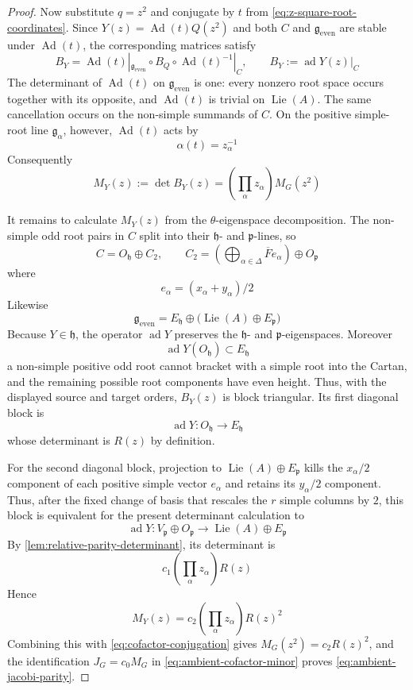 \documentclass[11pt]{amsart}
\theoremstyle{definition}
\theoremstyle{remark}
\newcommand{\Fb}{\overline F}
\newcommand{\Lie}{\operatorname{Lie}}
\newcommand{\Ad}{\operatorname{Ad}}
\newcommand{\ad}{\operatorname{ad}}
\newcommand{\g}{\mathfrak g}
\newcommand{\h}{\mathfrak h}
\newcommand{\p}{\mathfrak p}
\begin{document}
\begin{proof}
Now substitute $q=z^2$ and conjugate by $t$ from
\eqref{eq:z-square-root-coordinates}.  Since
$Y(z)=\Ad(t)Q(z^2)$ and both $C$ and $\g_{\mathrm{even}}$ are stable under
$\Ad(t)$, the corresponding matrices satisfy
\[
 B_Y
 =\Ad(t)|_{\g_{\mathrm{even}}}\circ
   B_Q\circ\Ad(t)^{-1}|_C,
 \qquad
 B_Y:=\ad Y(z)|_C
\]
The determinant of $\Ad(t)$ on $\g_{\mathrm{even}}$ is one: every nonzero
root space occurs together with its opposite, and $\Ad(t)$ is trivial on
$\Lie(A)$.  The same cancellation occurs on the non-simple summands of $C$.
On the positive simple-root line $\g_\alpha$, however,
$\Ad(t)$ acts by
\[
 \alpha(t)=z_\alpha^{-1}
\]
Consequently
\begin{equation}\label{eq:cofactor-conjugation}
 M_Y(z):=\det B_Y(z)
 =\left(\prod_\alpha z_\alpha\right)M_G(z^2)
\end{equation}

It remains to calculate $M_Y(z)$ from the $\theta$-eigenspace decomposition.
The non-simple odd root pairs in $C$ split into their $\h$- and $\p$-lines, so
\[
 C=O_\h\oplus C_2,
 \qquad
 C_2=
 \left(\bigoplus_{\alpha\in\Delta}\Fb e_\alpha\right)\oplus O_\p
\]
where
\[
 e_\alpha=(x_\alpha+y_\alpha)/2
\]
Likewise
\[
 \g_{\mathrm{even}}
 =E_\h\oplus\bigl(\Lie(A)\oplus E_\p\bigr)
\]
Because $Y\in\h$, the operator $\ad Y$ preserves the $\h$- and
$\p$-eigenspaces.  Moreover
\[
 \ad Y(O_\h)\subset E_\h
\]
a non-simple positive odd root cannot bracket with a simple root into the
Cartan, and the remaining possible root components have even height.  Thus,
with the displayed source and target orders, $B_Y(z)$ is block triangular.
Its first diagonal block is
\[
 \ad Y:O_\h\longrightarrow E_\h
\]
whose determinant is $R(z)$ by definition.

For the second diagonal block, projection to
$\Lie(A)\oplus E_\p$ kills the $x_\alpha/2$ component of each positive simple
vector $e_\alpha$ and retains its $y_\alpha/2$ component.  Thus, after the
fixed change of basis that rescales the $r$ simple columns by $2$, this block
is equivalent for the present determinant calculation to
\[
 \ad Y:V_\p\oplus O_\p
 \longrightarrow \Lie(A)\oplus E_\p
\]
By \cref{lem:relative-parity-determinant}, its determinant is
\[
 c_1\left(\prod_\alpha z_\alpha\right)R(z)
\]
Hence
\[
 M_Y(z)
 =c_2\left(\prod_\alpha z_\alpha\right)R(z)^2
\]
Combining this with \eqref{eq:cofactor-conjugation} gives
$M_G(z^2)=c_2R(z)^2$, and the identification
$J_G=c_0M_G$ in \eqref{eq:ambient-cofactor-minor} proves
\eqref{eq:ambient-jacobi-parity}.
\end{proof}
\end{document}

